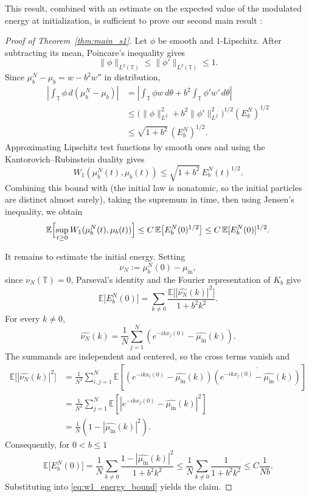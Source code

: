 \documentclass[11pt]{article}
\theoremstyle{definition}
\newcommand{\Torus}{\mathbb{T}}
\begin{document}
This result, combined with an estimate on the expected value of the modulated energy at initialization, is sufficient to prove our second main result :

\begin{proof}[Proof of Theorem~\ref{thm:main_s1}]

Let \(\phi\) be smooth and \(1\)-Lipschitz. After subtracting its
mean, Poincare's inequality gives
\[
\|\phi\|_{L^2(\Torus)}\le \|\phi'\|_{L^2(\Torus)}\le1 .
\]
Since
$
\mu^N_b-\mu_b=w-b^2w''$
in distribution,
\[
\begin{aligned}
\left|\int_{\Torus}\phi\,d(\mu^N_b-\mu_b)\right|
&=
\left|
\int_{\Torus}\phi w\,d\theta
+
b^2\int_{\Torus}\phi'w'\,d\theta
\right|
\\
&\le
\bigl(\|\phi\|_{L^2}^2+b^2\|\phi'\|_{L^2}^2\bigr)^{1/2}
(E^N_b)^{1/2}
\\
&\le
\sqrt{1+b^2}\,(E^N_b)^{1/2}.
\end{aligned}
\]
Approximating Lipschitz test functions by smooth ones and using the
Kantorovich--Rubinstein duality gives
\[
W_1(\mu^N_b(t),\mu_b(t))
\le
\sqrt{1+b^2}\,E^N_b(t)^{1/2}.
\]
Combining this bound with  (the initial law is nonatomic, so the initial particles are distinct almost
surely), taking the supremum in time, then using Jensen's inequality, 
we obtain
\begin{equation}
\label{eq:w1_energy_bound}
\mathbb E\Bigl[\sup_{t\ge0}W_1(\mu^N_b(t),\mu_b(t))\Bigr]
\le
C\,\mathbb E\bigl[E^N_b(0)^{1/2}\bigr]
\le
C\,\mathbb E[E^N_b(0)]^{1/2}.
\end{equation}

It remains to estimate the initial energy. Setting
\[
\nu_N:=\mu_b^N(0)-\mu_{\mathrm{in}},
\]
since \(\nu_N(\Torus)=0\), Parseval's identity and the Fourier representation
of \(K_b\) give
\[
\mathbb E\bigl[E_b^N(0)\bigr]
=
\sum_{k\neq0}
\frac{\mathbb E\bigl[|\widehat{\nu_N}(k)|^2\bigr]}
     {1+b^2k^2}.
\]
For every \(k\neq0\),
\[
\widehat{\nu_N}(k)
=
\frac1N\sum_{j=1}^N
\left(e^{-ikx_j(0)}-\widehat{\mu_{\mathrm{in}}}(k)\right).
\]
The summands are independent and centered, so the cross terms vanish and
\[
\begin{aligned}
\mathbb E\bigl[|\widehat{\nu_N}(k)|^2\bigr]
&=
\frac1{N^2}\sum_{i,j=1}^N
\mathbb E\left[
\left(e^{-ikx_i(0)}-\widehat{\mu_{\mathrm{in}}}(k)\right)
\overline{
\left(e^{-ikx_j(0)}-\widehat{\mu_{\mathrm{in}}}(k)\right)}
\right]
\\
&=
\frac1{N^2}\sum_{j=1}^N
\mathbb E\left[
\left|e^{-ikx_j(0)}-\widehat{\mu_{\mathrm{in}}}(k)\right|^2
\right]
\\
&=
\frac1N\left(1-|\widehat{\mu_{\mathrm{in}}}(k)|^2\right).
\end{aligned}
\]
Consequently, for $0 < b \leq 1$
\[
\mathbb E\bigl[E_b^N(0)\bigr]
=
\frac1N\sum_{k\neq0}
\frac{1-|\widehat{\mu_{\mathrm{in}}}(k)|^2}
     {1+b^2k^2} \le
\frac1N\sum_{k\neq0}\frac1{1+b^2k^2} \leq C \frac 1{Nb}.
\]
Substituting into \eqref{eq:w1_energy_bound} yields the claim.
\end{proof}
\end{document}
